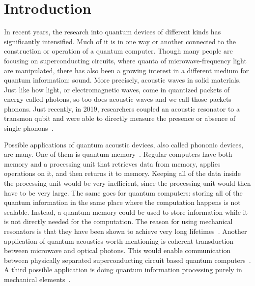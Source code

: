 \chapter{Introduction}

In recent years, the research into quantum devices of different kinds has
significantly intensified.
Much of it is in one way or another connected to the
construction or operation of a quantum computer.
Though many people are focusing on superconducting circuits, where quanta of
microwave-frequency light are manipulated, there has also been
a growing interest in a different medium for quantum information: sound.
More precisely, acoustic waves in solid materials.
Just like how light, or electromagnetic waves, come in quantized packets of energy called
photons,
so too does acoustic waves and we call those packets phonons.
Just recently, in 2019, researchers coupled an acoustic resonator to a transmon
qubit and were able to directly measure the presence or absence of single
phonons~\cite{arrangoiz-arriola_resolving_2019}.

Possible applications of quantum acoustic devices, also called phononic devices, are many.
One of them is quantum memory~\cite{sete_high-efficiency_2015}.
Regular computers have both memory and a processing unit that
retrieves data from memory, applies operations on it, and then returns it to
memory.
Keeping all of the data inside the processing unit would be very inefficient,
since the processing unit would then have to be very large.
The same goes for quantum computers: storing all of the quantum information in
the same place where the computation happens is not scalable.
Instead, a quantum memory could be used to store information while it is not
directly needed for the computation.
The reason for using mechanical resonators is that they have been shown to
achieve very long lifetimes~\cite{maccabe_phononic_2020}.
Another application of quantum acoustics worth mentioning is
coherent transduction between microwave and optical photons.
This would enable communication between physically separated superconducting
circuit based quantum computers~\cite{laer_controlling_2019}.
A third possible application is doing quantum information processing purely in
mechanical elements~\cite{qiao2023developing}.

